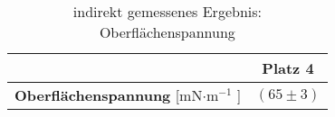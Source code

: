 \begin{table}[H]
	\centering
	\caption[Oberflächenspannung]{indirekt gemessenes Ergebnis: Oberflächenspannung}
	\begin{tabular}{|c|c|}
		\hline
		&Platz 4  \\
		\hline
		\textbf{Oberflächenspannung} [mN$ \cdot $m$ ^{-1} $ ]& $ (65\pm 3) $ \\
		\hline
	\end{tabular}
	\label{tab: Ergebnis Oberf.sp.}
\end{table}
